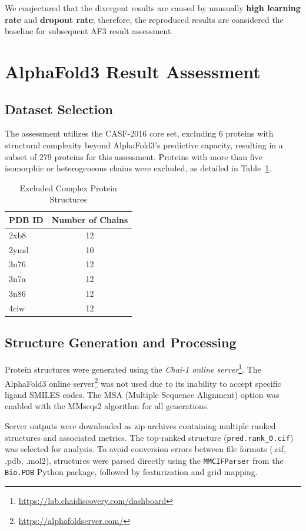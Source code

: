 \documentclass[unnumsec,webpdf,contemporary,large]{oup-authoring-template}
\theoremstyle{thmstyleone}%
\theoremstyle{thmstyletwo}%
\theoremstyle{thmstylethree}%
\begin{document}
We conjectured that the divergent results are caused by unusually \textbf{high learning rate} and \textbf{dropout rate};
therefore, the reproduced results are considered the baseline for subsequent AF3 result assessment.

\section{AlphaFold3 Result Assessment}

\subsection{Dataset Selection}
The assessment utilizes the CASF-2016 core set, excluding 6 proteins with structural complexity beyond AlphaFold3's predictive capacity, resulting in a subset of 279 proteins for this assessment. 
Proteins with more than five isomorphic or heterogeneous chains were excluded, as detailed in Table~\ref{tab:complex}.

\begin{table}[H]
\centering
\caption{Excluded Complex Protein Structures}
\label{tab:complex}
\begin{tabular}{lc}
\toprule
PDB ID & Number of Chains \\
\midrule
2xb8 & 12 \\
2ymd & 10 \\
3n76 & 12 \\
3n7a & 12 \\
3n86 & 12 \\
4ciw & 12 \\
\bottomrule
\end{tabular}
\end{table}

\subsection{Structure Generation and Processing}
Protein structures were generated using the \textit{Chai-1 online server}\footnote{\url{https://lab.chaidiscovery.com/dashboard}}. The AlphaFold3 online server\footnote{\url{https://alphafoldserver.com/}} was not used due to its inability to accept specific ligand SMILES codes. The MSA (Multiple Sequence Alignment) option was enabled with the MMseqs2 algorithm for all generations.

Server outputs were downloaded as zip archives containing multiple 
ranked structures and associated metrics. The top-ranked structure 
(\texttt{pred.rank\_0.cif}) was selected for analysis.
 To avoid conversion errors between file formats (.cif, .pdb, .mol2), 
 structures were parsed directly using the \texttt{MMCIFParser} from 
 the \texttt{Bio.PDB} Python package, followed by featurization and grid mapping.
\end{document}
